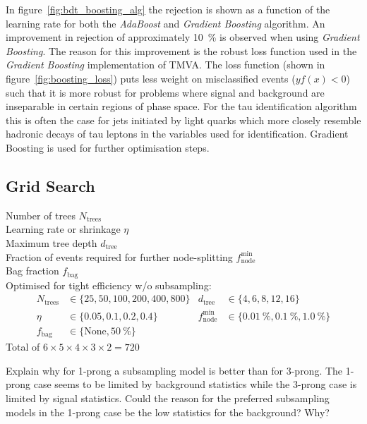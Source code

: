 In figure~\ref{fig:bdt_boosting_alg} the rejection is shown as a function of the
learning rate for both the \emph{AdaBoost} and \emph{Gradient Boosting}
algorithm. An improvement in rejection of approximately \SI{10}{\percent} is
observed when using \emph{Gradient Boosting}. The reason for this improvement is
the robust loss function used in the \emph{Gradient Boosting} implementation of
TMVA. The loss function (shown in figure~\ref{fig:boosting_loss}) puts less
weight on misclassified events ($y f(x) < 0$) such that it is more robust for
problems where signal and background are inseparable in certain regions of phase
space. For the tau identification algorithm this is often the case for jets
initiated by light quarks which more closely resemble hadronic decays of tau
leptons in the variables used for identification. Gradient Boosting is used for
further optimisation steps.

\subsection{Grid Search}
\label{sec:bdt_grid_search}

Number of trees $N_\text{trees}$ \\
Learning rate or shrinkage $\eta$ \\
Maximum tree depth $d_\text{tree}$ \\
Fraction of events required for further node-splitting $f_\text{node}^\text{min}$ \\
Bag fraction $f_\text{bag}$ \\




Optimised for tight efficiency w/o subsampling:
\begin{align*}
  N_\mathrm{trees} &\in \{25, 50, 100, 200, 400, 800\} &
  d_\mathrm{tree} &\in \{4, 6, 8, 12, 16\} \\
  \eta &\in \{0.05, 0.1, 0.2, 0.4\} &
  f_\mathrm{node}^\mathrm{min} &\in \{\SI{0.01}{\percent}, \SI{0.1}{\percent},\SI{1.0}{\percent}\} \\
  f_\text{bag} &\in \{\text{None}, \SI{50}{\percent} \}
\end{align*}
Total of $6 \times 5 \times 4 \times 3 \times 2 = 720$

Explain why for 1-prong a subsampling model is better than for 3-prong. The
1-prong case seems to be limited by background statistics while the 3-prong case
is limited by signal statistics. Could the reason for the preferred subsampling
models in the 1-prong case be the low statistics for the background? Why?

